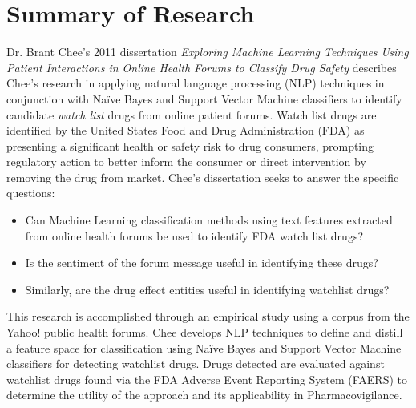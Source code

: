 \documentclass[twoside,11pt]{article}
\begin{document}
\section{Summary of Research}
Dr. Brant Chee's 2011 dissertation \textit{Exploring Machine Learning Techniques Using
Patient Interactions in Online Health Forums to Classify Drug Safety} describes
Chee's research in applying natural language processing (NLP) techniques in conjunction with Na\"ive Bayes and Support Vector Machine classifiers to identify candidate \textit{watch list} drugs from online patient forums. Watch list drugs are identified by the United States Food and Drug Administration (FDA) as presenting a significant health or safety risk to drug consumers, prompting regulatory action to better inform the consumer or direct intervention by removing the drug from market. Chee's dissertation seeks to answer the specific questions:
\begin{itemize}
  \item Can Machine Learning classification methods using text features extracted from online health forums be used to identify FDA watch list drugs?
  \item Is the sentiment of the forum message useful in identifying these drugs?
  \item Similarly, are the drug effect entities useful in identifying watchlist drugs?
\end{itemize}

This research is accomplished through an empirical study using a corpus from the
Yahoo! public health forums. Chee develops NLP techniques to define and distill a feature space for classification using Na\"ive Bayes and
Support Vector Machine classifiers for detecting watchlist drugs. Drugs detected are evaluated against watchlist drugs found via the FDA Adverse Event Reporting System (FAERS) to determine the utility of the approach and its applicability in Pharmacovigilance. %
\end{document}
